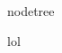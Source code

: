 \documentclass{article}
\begin{document}
\begin{NodetreeEmbed}
nodetree
\end{NodetreeEmbed}

lol
\end{document}

